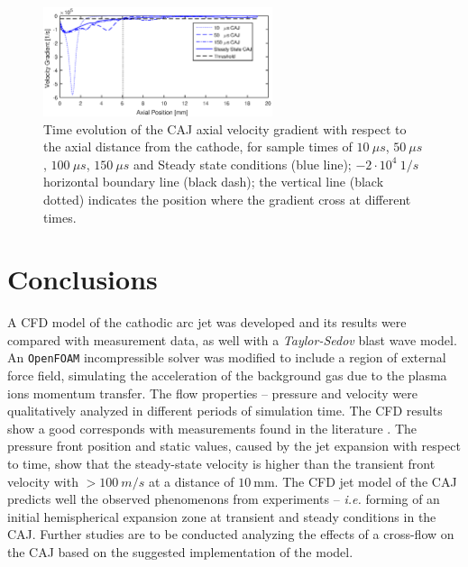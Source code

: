 \documentclass[a4paper]{iacas}%
\begin{document}
\begin{figure}
	\centering
	\includegraphics[width=0.6\textwidth]{CAJAcceleration.eps}
	\caption{Time evolution of the CAJ axial velocity gradient with respect to the axial distance from the cathode, for sample times of $10~\mu s$, $50~\mu s$, $100~\mu s$, $150~\mu s$ and Steady state conditions (blue line); $-2\cdot 10^4~1/s$ horizontal boundary line (black dash); the vertical line (black dotted) indicates the position where the gradient cross at different times. }
	\label{fig:model_caj_acceleration}
\end{figure}

\section{Conclusions}
A CFD model of the cathodic arc jet was developed and its results were compared with measurement data, as well with a \emph{Taylor-Sedov} blast wave model.
An \texttt{OpenFOAM} incompressible solver was modified to include a region of external force field, simulating the acceleration of the background gas due to the plasma ions momentum transfer.
The flow properties -- pressure and velocity were qualitatively analyzed in different periods of simulation time. The CFD results show a good corresponds with measurements found in the literature \cite{KR,KRClose,KRFar}. The pressure front position and static values, caused by the jet expansion with respect to time, show that the steady-state velocity is higher than the transient front velocity with $> 100~m/s$ at a distance of $10~\mathrm{mm}$.
The CFD jet model of the CAJ predicts well the observed phenomenons from experiments -- \emph{i.e.} forming of an initial hemispherical expansion zone at transient and steady conditions in the CAJ. Further studies are to be conducted analyzing the effects of a cross-flow on the CAJ based on the suggested implementation of the model.

\clearpage


\end{document}

